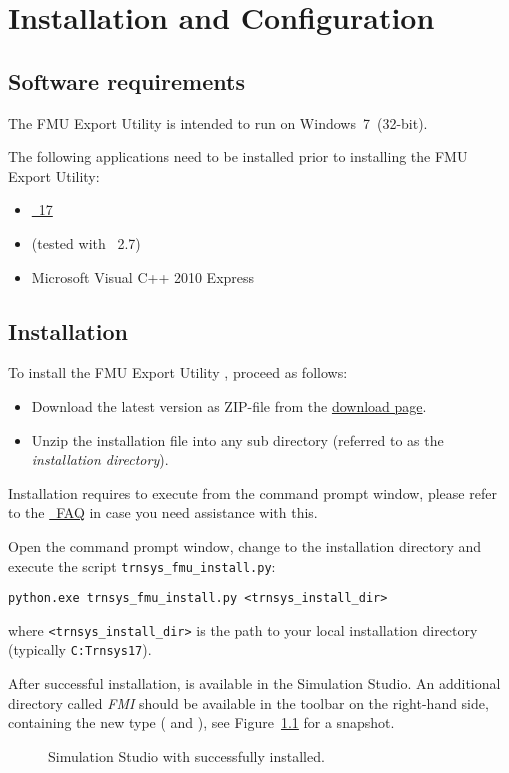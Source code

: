 \chapter{Installation and Configuration}

\section{Software requirements}

The \fmipp \trnsys FMU Export Utility is intended to run on Windows~7~(32-bit).

The following applications need to be installed prior to installing the \fmipp \trnsys FMU Export Utility:
\begin{itemize}
  \item \href{http://www.trnsys.com/}{\trnsys~17}
  \item \href{https://www.python.org/}{\python} (tested with \python~2.7)
  \item Microsoft Visual C++ 2010 Express
\end{itemize}


\section{Installation}
\label{sec:install}

To install the \fmipp \trnsys FMU Export Utility , proceed as follows:
\begin{itemize}
  \item Download the latest version as ZIP-file from the \href{http://sourceforge.net/projects/trnsys-fmu/files/latest/download}{download page}.
  \item Unzip the installation file into any sub directory (referred to as the \emph{installation directory}).
\end{itemize}

Installation requires to execute \python from the command prompt window, please refer to the \href{https://docs.python.org/2/faq/windows.html}{\python~FAQ} in case you need assistance with this.

Open the command prompt window, change to the installation directory and execute the script \texttt{trnsys\_fmu\_install.py}:
\begin{verbatim}
python.exe trnsys_fmu_install.py <trnsys_install_dir>
\end{verbatim}
where \texttt{<trnsys\_install\_dir>} is the path to your local \trnsys installation directory (typically \texttt{C:Trnsys17}).

After successful installation, \type is available in the \trnsys Simulation Studio. An additional directory called \emph{FMI} should be available in the toolbar on the right-hand side, containing the new \trnsys type (\emph{\typea} and \emph{\typeb}), see Figure~\ref{fig:simulation_studio_overview} for a snapshot.

\begin{figure}
\caption{Simulation Studio with \type successfully installed.}
\label{fig:simulation_studio_overview}
\end{figure}
